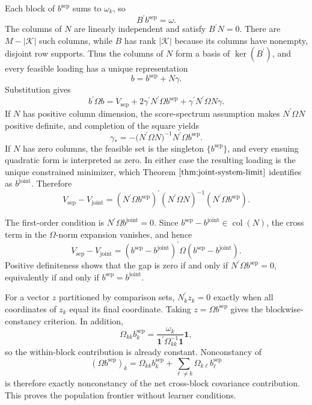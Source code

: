 Each block of \(b^{\mathrm{sep}}\) sums to \(\omega_k\), so
\[
 B^{\prime}b^{\mathrm{sep}}=\omega.
\]
The columns of \(N\) are linearly independent and satisfy \(B^{\prime}N=0\).  There are \(M-|\mathcal K|\) such columns, while \(B\) has rank \(|\mathcal K|\) because its columns have nonempty, disjoint row supports.  Thus the columns of \(N\) form a basis of \(\ker(B^{\prime})\), and every feasible loading has a unique representation
\[
 b=b^{\mathrm{sep}}+N\gamma.
\]
Substitution gives
\[
 b^{\prime}\Omega b
 =V_{\mathrm{sep}}+2\gamma^{\prime}N^{\prime}\Omega b^{\mathrm{sep}}
 +\gamma^{\prime}N^{\prime}\Omega N\gamma.
\]
If \(N\) has positive column dimension, the score-spectrum assumption makes \(N^{\prime}\Omega N\) positive definite, and completion of the square yields
\[
 \gamma_*=-\bigl(N^{\prime}\Omega N\bigr)^{-1}N^{\prime}\Omega b^{\mathrm{sep}}.
\]
If \(N\) has zero columns, the feasible set is the singleton \(\{b^{\mathrm{sep}}\}\), and every ensuing quadratic form is interpreted as zero.  In either case the resulting loading is the unique constrained minimizer, which Theorem \(\ref{thm:joint-system-limit}\) identifies as \(b^{\mathrm{joint}}\).  Therefore
\[
 V_{\mathrm{sep}}-V_{\mathrm{joint}}
 =(N^{\prime}\Omega b^{\mathrm{sep}})^{\prime}
 (N^{\prime}\Omega N)^{-1}
 (N^{\prime}\Omega b^{\mathrm{sep}}).
\]

The first-order condition is \(N^{\prime}\Omega b^{\mathrm{joint}}=0\).  Since \(b^{\mathrm{sep}}-b^{\mathrm{joint}}\in\operatorname{col}(N)\), the cross term in the \(\Omega\)-norm expansion vanishes, and hence
\[
 V_{\mathrm{sep}}-V_{\mathrm{joint}}
 =(b^{\mathrm{sep}}-b^{\mathrm{joint}})^{\prime}
 \Omega(b^{\mathrm{sep}}-b^{\mathrm{joint}}).
\]
Positive definiteness shows that the gap is zero if and only if \(N^{\prime}\Omega b^{\mathrm{sep}}=0\), equivalently if and only if \(b^{\mathrm{sep}}=b^{\mathrm{joint}}\).

For a vector \(z\) partitioned by comparison sets, \(N_k^{\prime}z_k=0\) exactly when all coordinates of \(z_k\) equal its final coordinate.  Taking \(z=\Omega b^{\mathrm{sep}}\) gives the blockwise-constancy criterion.  In addition,
\[
 \Omega_{kk}b_k^{\mathrm{sep}}
 =\frac{\omega_k}{\mathbf 1^{\prime}\Omega_{kk}^{-1}\mathbf 1}\mathbf 1,
\]
so the within-block contribution is already constant.  Nonconstancy of
\[
 (\Omega b^{\mathrm{sep}})_k
 =\Omega_{kk}b_k^{\mathrm{sep}}
 +\sum_{\ell\ne k}\Omega_{k\ell}b_\ell^{\mathrm{sep}}
\]
is therefore exactly nonconstancy of the net cross-block covariance contribution.  This proves the population frontier without learner conditions.

